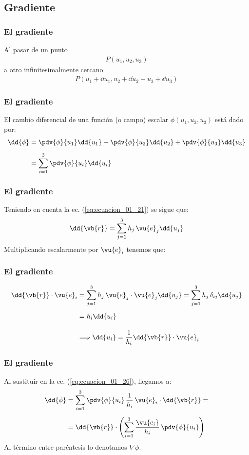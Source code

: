 \subsection{Gradiente}
\begin{frame}
\frametitle{El gradiente}
Al pasar de un punto 
\begin{align*}
P(u_{1}, u_{2}, u_{3})
\end{align*}
a otro infinitesimalmente cercano 
\begin{align*}
P(u_{1} + \dd{u}_{1}, u_{2} + \dd{u_{2}} + u_{3} + \dd{u_{3}})
\end{align*}
\end{frame}
\begin{frame}
\frametitle{El gradiente}
El cambio diferencial de una función (o campo) escalar $\phi(u_{1}, u_{2}, u_{3})$ está dado por:
\begin{align}
\begin{aligned}
\dd{\phi} &= \pdv{\phi}{u_{1}} \dd{u_{1}} + \pdv{\phi}{u_{2}} \dd{u_{2}} + \pdv{\phi}{u_{3}} \dd{u_{3}} \\[0.5em]
&= \sum_{i=1}^{3} \pdv{\phi}{u_{i}} \dd{u_{i}}
\end{aligned}
\label{eq:ecuacion_01_26}
\end{align}
\end{frame}
\begin{frame}
\frametitle{El gradiente}
Teniendo en cuenta la ec. (\ref{eq:ecuacion_01_21}) se sigue que:
\begin{align}
\dd{\vb{r}} = \sum_{j=1}^{3} h_{j} \, \vu{e}_{j} \dd{u_{j}}
\label{eq:ecuacion_01_27}
\end{align}
\pause
Multiplicando escalarmente por $\vu{e}_{i}$ tenemos que:
\end{frame}
\begin{frame}
\frametitle{El gradiente}
\begin{align*}
\dd{\vb{r}} \cdot \vu{e}_{i} &= \sum_{j=1}^{3} h_{j} \, \vu{e}_{j} \cdot \vu{e}_{j} \dd{u_{j}} = \sum_{j=1}^{3} h_{j} \, \delta_{ij} \dd{u_{j}} \\[0.5em]
&= h_{i} \dd{u_{i}} \\[1em]
&\Longrightarrow \dd{u_{i}} = \dfrac{1}{h_{i}} \dd{\vb{r}} \cdot \vu{e}_{i}
\end{align*}
\end{frame}
\begin{frame}
\frametitle{El gradiente}
Al sustituir en la ec. (\ref{eq:ecuacion_01_26}), llegamos a:
\begin{align*}
\dd{\phi} &= \sum_{i=1}^{3} \pdv{\phi}{u_{i}} \, \dfrac{1}{h_{i}} \, \vu{e}_{i} \cdot \dd{\vb{r}} = \\[0.5em]
&= \dd{\vb{r}} \cdot \left( \sum_{i=1}^{3} \dfrac{\vu{e_{i}}}{h_{i}} \, \pdv{\phi}{u_{i}} \right)
\end{align*}
\pause
Al término entre paréntesis lo denotamos $\nabla{\phi}$.
\end{frame}
